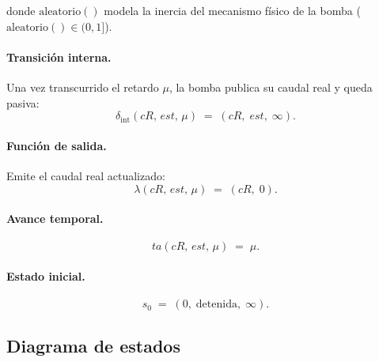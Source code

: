 \documentclass{article}
\newcommand{\dint}{\delta_{\mathrm{int}}}
\newcommand{\ta}{\mathit{ta}}
\begin{document}
\noindent
donde $\mathrm{aleatorio}()$ modela la inercia del mecanismo físico de la
bomba ($\mathrm{aleatorio}() \in (0,1]$).

\paragraph{Transición interna.}
Una vez transcurrido el retardo $\mu$, la bomba publica su caudal real
y queda pasiva:
\[
  \dint(cR,\,est,\,\mu) \;=\; (cR,\;est,\;\infty).
\]

\paragraph{Función de salida.}
Emite el caudal real actualizado:
\[
  \lambda(cR,\,est,\,\mu) \;=\; (cR,\;0).
\]

\paragraph{Avance temporal.}
\[
  \ta(cR,\,est,\,\mu) \;=\; \mu.
\]

\paragraph{Estado inicial.}
\[
  s_0 \;=\; (0,\;\mathrm{detenida},\;\infty).
\]



\subsection{Diagrama de estados}

\begin{center}
\end{center}
\end{document}
